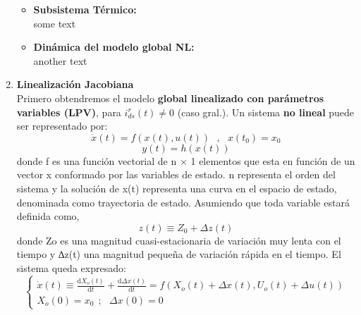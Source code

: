 \documentclass[10pt]{article}
\begin{document}
\begin{enumerate}
\begin{itemize}
		\item \textbf{Subsistema Térmico:}\vspace{0.3cm}\\
		some text

		\item \textbf{Dinámica del modelo global NL:}\vspace{0.3cm}\\
		another text

	\end{itemize}

    \item \textbf{Linealización Jacobiana}
    \vspace{0.3cm} 
    \\Primero obtendremos el modelo \textbf{global linealizado con parámetros variables (LPV)}, para $ i_{ds}^{r}\left( t \right ) \neq 0 $ (caso gral.). 
    Un sistema \textbf{no lineal} puede ser representado por:
    \begin{equation}
        \dot{x}\left ( t \right )= f\left ( x\left ( t \right ),u\left ( t \right ) \right ) \ \ \ ,\ \ \ x\left ( t_{0} \right )=x_{0}
    \end{equation}
    \begin{equation}
        y\left ( t \right )=h\left ( x\left ( t \right ) \right )
    \end{equation}
    donde f es una función vectorial de n × 1 elementos que esta en función de un vector x conformado por las variables de estado.
    n representa el orden del sistema y la solución de x(t) representa una curva en el espacio de estado, denominada como trayectoria de estado.
    Asumiendo que toda variable estará definida como,
    \begin{equation}
        z\left ( t \right )\equiv Z_{0} + \Delta z\left ( t \right )
    \end{equation}
    donde Zo es una magnitud cuasi-estacionaria de variación muy lenta con el tiempo y ∆z(t) una magnitud pequeña de variación rápida en el tiempo.
    El sistema queda expresado:
    \begin{equation}
        \begin{cases}
            \dot{x}\left ( t \right )\equiv
            \frac{\mathrm{d} X_{o}\left ( t \right )}{\mathrm{d} t}+
            \frac{\mathrm{d} \Delta x\left ( t \right )}{\mathrm{d} t}
            =
            f\left ( X_{o}\left ( t \right )+\Delta x\left ( t \right ),U_{o}\left ( t \right )+\Delta u\left ( t \right ) \right )
            \\
            X_{o}\left ( 0 \right )=x_{0}\ \ ;\ \ \ \Delta x\left ( 0 \right )=0
        \end{cases}
    \end{equation}


\end{enumerate}
\end{document}

